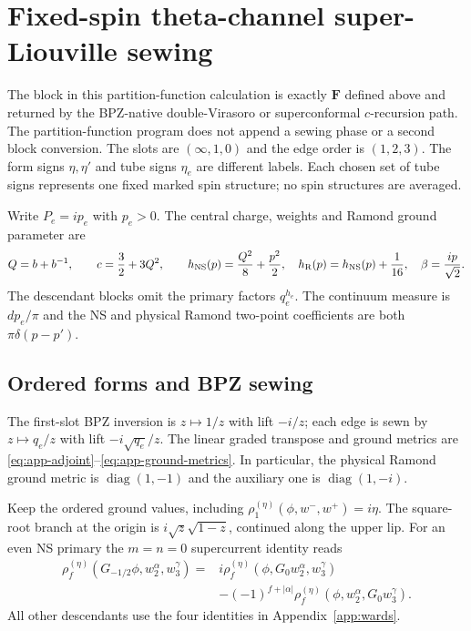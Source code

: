 \clearpage
\begingroup
\section{Fixed-spin theta-channel super-Liouville sewing}
\label{app:partition-test}

The block in this partition-function calculation is exactly
$\mathbf F$ defined above and returned by the BPZ-native
double-Virasoro or superconformal $c$-recursion path. The
partition-function program does not append a sewing phase or a
second block conversion. The slots are $(\infty,1,0)$ and the edge
order is $(1,2,3)$. The form signs $\eta,\eta'$ and tube signs
$\eta_e$ are different labels. Each chosen set of tube signs
represents one fixed marked spin structure; no spin structures are
averaged.

Write $P_e=ip_e$ with $p_e>0$. The central charge, weights and
Ramond ground parameter are
\begin{equation}
 Q=b+b^{-1},\qquad c=\frac32+3Q^2,\qquad
 h_{\mathrm{NS}}(p)=\frac{Q^2}{8}+\frac{p^2}{2},\quad
 h_{\mathrm R}(p)=h_{\mathrm{NS}}(p)+\frac1{16},\quad
 \beta=\frac{ip}{\sqrt2}.
 \label{eq:partition-spectrum}
\end{equation}
The descendant blocks omit the primary factors $q_e^{h_e}$.
The continuum measure is $dp_e/\pi$ and the NS and physical Ramond
two-point coefficients are both $\pi\delta(p-p')$.

\subsection{Ordered forms and BPZ sewing}

The first-slot BPZ inversion is $z\mapsto1/z$ with lift $-i/z$;
each edge is sewn by $z\mapsto q_e/z$ with lift
$-i\sqrt{q_e}/z$. The linear graded transpose and ground metrics
are \eqref{eq:app-adjoint}--\eqref{eq:app-ground-metrics}.
In particular, the physical Ramond ground metric is
$\operatorname{diag}(1,-1)$ and the auxiliary one is
$\operatorname{diag}(1,-i)$.

Keep the ordered ground values, including
$\rho_1^{(\eta)}(\phi,w^-,w^+)=i\eta$. The square-root branch at
the origin is $i\sqrt z\sqrt{1-z}$, continued along the upper lip.
For an even NS primary the $m=n=0$ supercurrent identity reads
\begin{align}
 \rho_f^{(\eta)}(G_{-1/2}\phi,w_2^\alpha,w_3^\gamma)
 ={}&i\rho_f^{(\eta)}(\phi,G_0w_2^\alpha,w_3^\gamma)\nonumber\\
 &-(-1)^{f+|\alpha|}
       \rho_f^{(\eta)}(\phi,w_2^\alpha,G_0w_3^\gamma).
 \label{eq:partition-ordered-ward}
\end{align}
All other descendants use the four identities in
Appendix~\ref{app:wards}.

